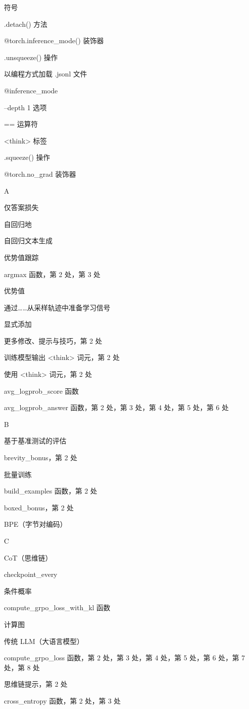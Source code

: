 符号

.detach() 方法

@torch.inference\_mode() 装饰器

.unsqueeze() 操作

以编程方式加载 .jsonl 文件

@inference\_mode

--depth 1 选项

== 运算符

\textless{}think\textgreater{} 标签

.squeeze() 操作

@torch.no\_grad 装饰器

A

仅答案损失

自回归地

自回归文本生成

优势值跟踪

argmax 函数，第 2 处，第 3 处

优势值

通过……从采样轨迹中准备学习信号

显式添加

更多修改、提示与技巧，第 2 处

训练模型输出 \textless{}think\textgreater{} 词元，第 2 处

使用 \textless{}think\textgreater{} 词元，第 2 处

avg\_logprob\_score 函数

avg\_logprob\_answer 函数，第 2 处，第 3 处，第 4 处，第 5 处，第 6 处

B

基于基准测试的评估

brevity\_bonus，第 2 处

批量训练

build\_examples 函数，第 2 处

boxed\_bonus，第 2 处

BPE（字节对编码）

C

CoT（思维链）

checkpoint\_every

条件概率

compute\_grpo\_loss\_with\_kl 函数

计算图

传统 LLM（大语言模型）

compute\_grpo\_loss 函数，第 2 处，第 3 处，第 4 处，第 5 处，第 6 处，第 7 处，第 8 处

思维链提示，第 2 处

cross\_entropy 函数，第 2 处，第 3 处


